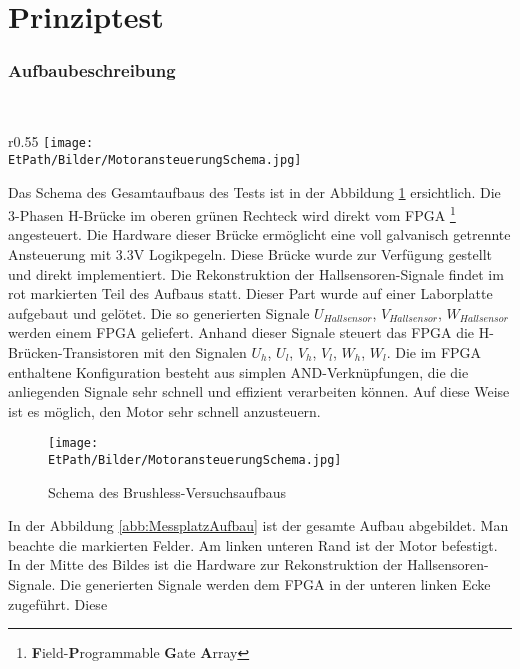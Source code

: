 \ifSTANDALONE
\section{Prinziptest}
\fi
\ifEMBED
\subsubsection{Aufbaubeschreibung}
    \BLDCcollab \\
\fi
\ifEMBED
    \begin{wrapfigure}{r}{0.55\textwidth}
       	\texttt{[image: \\EtPath/Bilder/MotoransteuerungSchema.jpg]}
       	\centering
       	\caption{Schema des Brushless-Versuchsaufbaus}
        \label{abb:MotoransteuerungSchema}
    \end{wrapfigure}
\fi
    Das Schema des Gesamtaufbaus des Tests ist in der Abbildung 
    \ref{abb:MotoransteuerungSchema} ersichtlich. Die 3-Phasen H-Brücke 
    im oberen grünen Rechteck wird direkt vom FPGA \footnote{\textbf{F}ield-\textbf{P}rogrammable \textbf{G}ate \textbf{A}rray} angesteuert. Die Hardware 
    dieser Brücke ermöglicht eine voll galvanisch getrennte Ansteuerung 
    mit 3.3V Logikpegeln. Diese Brücke wurde zur Verfügung gestellt und direkt
    implementiert. Die Rekonstruktion der Hallsensoren-Signale findet im rot 
    markierten Teil des Aufbaus statt. Dieser Part wurde auf einer 
    Laborplatte aufgebaut und gelötet. Die so generierten Signale 
    $U_{Hallsensor}$, $V_{Hallsensor}$, $W_{Hallsensor}$ werden einem FPGA 
    geliefert. Anhand dieser Signale steuert das FPGA die 
    H-Brücken-Transistoren mit den Signalen $U_h$, $U_l$, $V_h$, $V_l$, 
    $W_h$, $W_l$. Die im FPGA enthaltene Konfiguration besteht aus simplen 
    AND-Verknüpfungen, die die anliegenden Signale sehr schnell und 
    effizient verarbeiten können. Auf diese Weise ist es möglich, den Motor sehr 
    schnell anzusteuern.
    \ifSTANDALONE
    \begin{figure}[h!]
    	\texttt{[image: \\EtPath/Bilder/MotoransteuerungSchema.jpg]}
       	\centering
       	\caption{Schema des Brushless-Versuchsaufbaus}
        \label{abb:MotoransteuerungSchema}
    \end{figure}
    \fi
    In der Abbildung \ref{abb:MessplatzAufbau} ist der gesamte Aufbau 
    abgebildet. Man beachte die markierten Felder. Am linken unteren Rand 
    ist der Motor befestigt. In der Mitte des Bildes ist die Hardware zur Rekonstruktion der Hallsensoren-Signale.
    Die generierten Signale werden dem FPGA in der unteren linken Ecke zugeführt. Diese 
